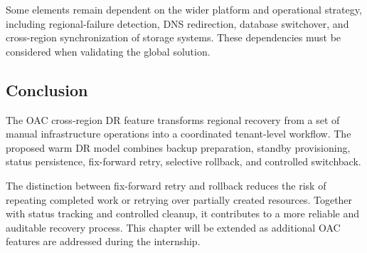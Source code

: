 Some elements remain dependent on the wider platform and operational strategy, including regional-failure detection, DNS redirection, database switchover, and cross-region synchronization of storage systems. These dependencies must be considered when validating the global solution.

\subsection{Conclusion}

The OAC cross-region DR feature transforms regional recovery from a set of manual infrastructure operations into a coordinated tenant-level workflow. The proposed warm DR model combines backup preparation, standby provisioning, status persistence, fix-forward retry, selective rollback, and controlled switchback.

The distinction between fix-forward retry and rollback reduces the risk of repeating completed work or retrying over partially created resources. Together with status tracking and controlled cleanup, it contributes to a more reliable and auditable recovery process. This chapter will be extended as additional OAC features are addressed during the internship.
